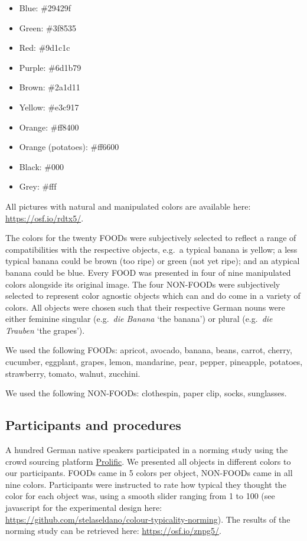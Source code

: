 \documentclass[
  12pt,
]{article}
\providecommand{\tightlist}{%
  \setlength{\itemsep}{0pt}\setlength{\parskip}{0pt}}
\begin{document}
\begin{itemize}
\tightlist
\item
  Blue: \#29429f
\item
  Green: \#3f8535
\item
  Red: \#9d1c1c
\item
  Purple: \#6d1b79
\item
  Brown: \#2a1d11
\item
  Yellow: \#e3c917
\item
  Orange: \#ff8400
\item
  Orange (potatoes): \#ff6600
\item
  Black: \#000
\item
  Grey: \#fff
\end{itemize}

All pictures with natural and manipulated colors are available here: \url{https://osf.io/rdtx5/}.

The colors for the twenty FOODs were subjectively selected to reflect a range of compatibilities with the respective objects, e.g.~a typical banana is yellow; a less typical banana could be brown (too ripe) or green (not yet ripe); and an atypical banana could be blue.
Every FOOD was presented in four of nine manipulated colors alongside its original image.
The four NON-FOODs were subjectively selected to represent color agnostic objects which can and do come in a variety of colors.
All objects were chosen such that their respective German nouns were either feminine singular (e.g.~\emph{die Banana} `the banana') or plural (e.g.~\emph{die Trauben} `the grapes').

We used the following FOODs: apricot, avocado, banana, beans, carrot, cherry, cucumber, eggplant, grapes, lemon, mandarine, pear, pepper, pineapple, potatoes, strawberry, tomato, walnut, zucchini.

We used the following NON-FOODs: clothespin, paper clip, socks, sunglasses.

\hypertarget{participants-and-procedures}{%
\subsection{Participants and procedures}\label{participants-and-procedures}}

A hundred German native speakers participated in a norming study using the crowd sourcing platform \href{https://www.prolific.ac}{Prolific}.
We presented all objects in different colors to our participants.
FOODs came in 5 colors per object, NON-FOODs came in all nine colors.
Participants were instructed to rate how typical they thought the color for each object was, using a smooth slider ranging from 1 to 100 (see javascript for the experimental design here: \url{https://github.com/stelaseldano/colour-typicality-norming}).
The results of the norming study can be retrieved here: \url{https://osf.io/znpg5/}.
\end{document}

